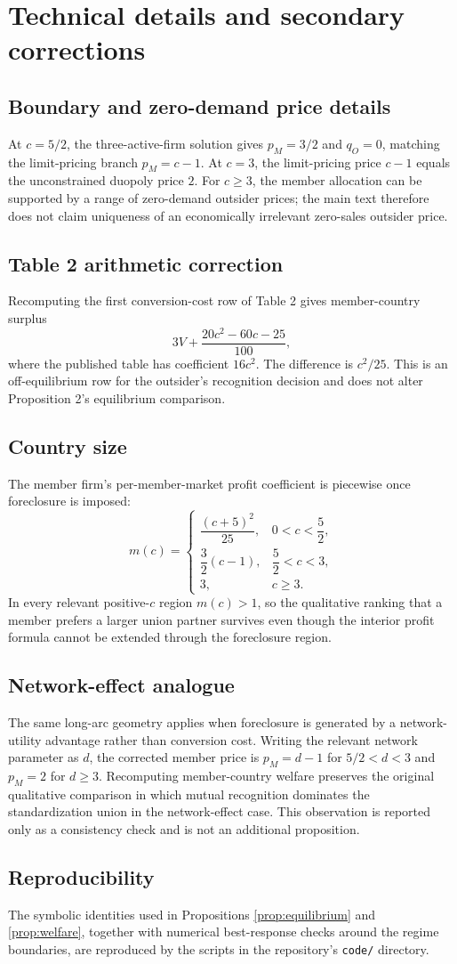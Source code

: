 \section{Technical details and secondary corrections}\label{app:technical}

\subsection{Boundary and zero-demand price details}
At $c=5/2$, the three-active-firm solution gives $p_M=3/2$ and $q_O=0$, matching the limit-pricing branch $p_M=c-1$. At $c=3$, the limit-pricing price $c-1$ equals the unconstrained duopoly price $2$. For $c\geq3$, the member allocation can be supported by a range of zero-demand outsider prices; the main text therefore does not claim uniqueness of an economically irrelevant zero-sales outsider price.

\subsection{Table 2 arithmetic correction}
Recomputing the first conversion-cost row of Table 2 gives member-country surplus
\[
 3V+\frac{20c^2-60c-25}{100},
\]
where the published table has coefficient $16c^2$. The difference is $c^2/25$. This is an off-equilibrium row for the outsider's recognition decision and does not alter Proposition 2's equilibrium comparison.

\subsection{Country size}
The member firm's per-member-market profit coefficient is piecewise once foreclosure is imposed:
\[
 m(c)=
 \begin{cases}
 \dfrac{(c+5)^2}{25}, & 0<c<\dfrac52,\\[4pt]
 \dfrac32(c-1), & \dfrac52<c<3,\\[4pt]
 3, & c\geq3.
 \end{cases}
\]
In every relevant positive-$c$ region $m(c)>1$, so the qualitative ranking that a member prefers a larger union partner survives even though the interior profit formula cannot be extended through the foreclosure region.

\subsection{Network-effect analogue}
The same long-arc geometry applies when foreclosure is generated by a network-utility advantage rather than conversion cost. Writing the relevant network parameter as $d$, the corrected member price is $p_M=d-1$ for $5/2<d<3$ and $p_M=2$ for $d\geq3$. Recomputing member-country welfare preserves the original qualitative comparison in which mutual recognition dominates the standardization union in the network-effect case. This observation is reported only as a consistency check and is not an additional proposition.

\subsection{Reproducibility}
The symbolic identities used in Propositions \ref{prop:equilibrium} and \ref{prop:welfare}, together with numerical best-response checks around the regime boundaries, are reproduced by the scripts in the repository's \texttt{code/} directory.
